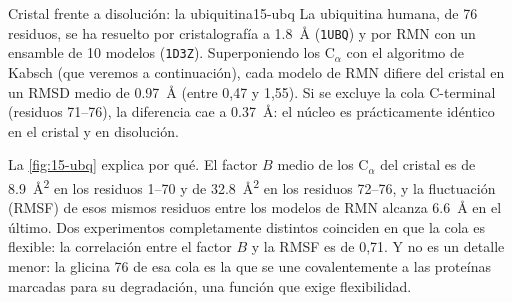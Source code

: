 \begin{ejemplo}{Cristal frente a disolución: la ubiquitina}{15-ubq}
La ubiquitina humana, de 76 residuos, se ha resuelto por cristalografía a \SI{1,8}{\angstrom} (\texttt{1UBQ}) y por RMN con un ensamble de 10 modelos (\texttt{1D3Z}). Superponiendo los C$_\alpha$ con el algoritmo de Kabsch (que veremos a continuación), cada modelo de RMN difiere del cristal en un RMSD medio de \SI{0,97}{\angstrom} (entre 0,47 y 1,55). Si se excluye la cola C-terminal (residuos 71--76), la diferencia cae a \SI{0,37}{\angstrom}: el núcleo es prácticamente idéntico en el cristal y en disolución.

La \cref{fig:15-ubq} explica por qué. El factor $B$ medio de los C$_\alpha$ del cristal es de \SI{8,9}{\angstrom^2} en los residuos 1--70 y de \SI{32,8}{\angstrom^2} en los residuos 72--76, y la fluctuación (RMSF) de esos mismos residuos entre los modelos de RMN alcanza \SI{6,6}{\angstrom} en el último. Dos experimentos completamente distintos coinciden en que la cola es flexible: la correlación entre el factor $B$ y la RMSF es de 0,71. Y no es un detalle menor: la glicina 76 de esa cola es la que se une covalentemente a las proteínas marcadas para su degradación, una función que exige flexibilidad.
\end{ejemplo}

